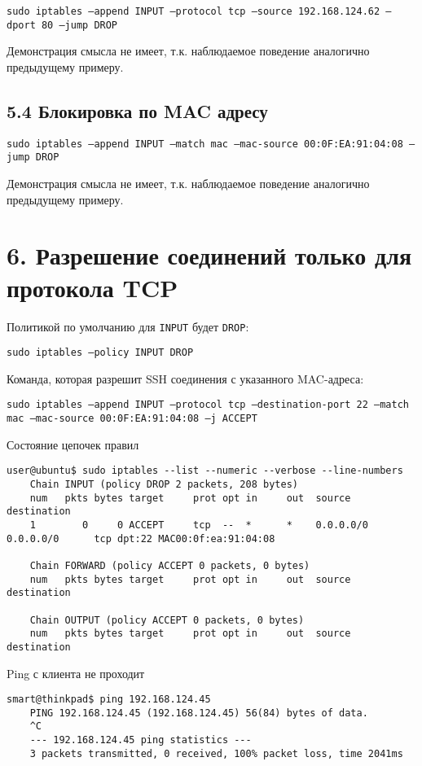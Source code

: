 \texttt{sudo iptables --append INPUT --protocol tcp --source 192.168.124.62 --dport 80 --jump DROP}

Демонстрация смысла не имеет, т.к. наблюдаемое поведение аналогично предыдущему примеру.

\subsection*{5.4 Блокировка по MAC адресу}

\texttt{sudo iptables --append INPUT --match mac --mac-source 00:0F:EA:91:04:08 --jump DROP}

Демонстрация смысла не имеет, т.к. наблюдаемое поведение аналогично предыдущему примеру.

\section*{6. Разрешение соединений только для протокола TCP}

Политикой по умолчанию для \texttt{INPUT} будет \texttt{DROP}:

\texttt{sudo iptables --policy INPUT DROP}

Команда, которая разрешит SSH соединения с указанного MAC-адреса:

\texttt{sudo iptables --append INPUT  --protocol tcp --destination-port 22 --match mac --mac-source 00:0F:EA:91:04:08 --j ACCEPT}

Состояние цепочек правил
\begin{Verbatim}[frame=single,breaklines=true,breakanywhere=true]
    user@ubuntu$ sudo iptables --list --numeric --verbose --line-numbers
    Chain INPUT (policy DROP 2 packets, 208 bytes)
    num   pkts bytes target     prot opt in     out  source      destination
    1        0     0 ACCEPT     tcp  --  *      *    0.0.0.0/0   0.0.0.0/0      tcp dpt:22 MAC00:0f:ea:91:04:08

    Chain FORWARD (policy ACCEPT 0 packets, 0 bytes)
    num   pkts bytes target     prot opt in     out  source      destination

    Chain OUTPUT (policy ACCEPT 0 packets, 0 bytes)
    num   pkts bytes target     prot opt in     out  source      destination 
\end{Verbatim}

Ping с клиента не проходит
\begin{Verbatim}[frame=single,breaklines=true,breakanywhere=true]
    smart@thinkpad$ ping 192.168.124.45
    PING 192.168.124.45 (192.168.124.45) 56(84) bytes of data.
    ^C
    --- 192.168.124.45 ping statistics ---
    3 packets transmitted, 0 received, 100% packet loss, time 2041ms
\end{Verbatim}

